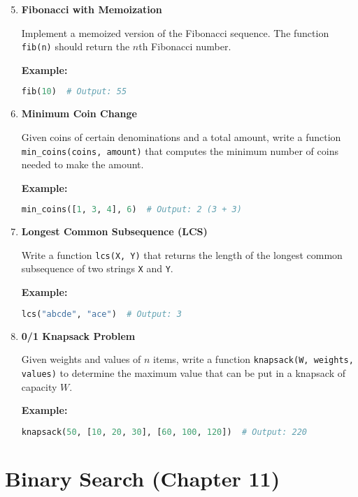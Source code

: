 \documentclass{article}
\begin{document}
\begin{enumerate}
    \setcounter{enumi}{4}
    \item \textbf{Fibonacci with Memoization}

    Implement a memoized version of the Fibonacci sequence. The function \texttt{fib(n)} should return the $n$th Fibonacci number.

    \textbf{Example:}
    \begin{lstlisting}[language=Python]
    fib(10)  # Output: 55
    \end{lstlisting}

    \item \textbf{Minimum Coin Change}

    Given coins of certain denominations and a total amount, write a function \texttt{min\_coins(coins, amount)} that computes the minimum number of coins needed to make the amount.

    \textbf{Example:}
    \begin{lstlisting}[language=Python]
    min_coins([1, 3, 4], 6)  # Output: 2 (3 + 3)
    \end{lstlisting}

    \item \textbf{Longest Common Subsequence (LCS)}

    Write a function \texttt{lcs(X, Y)} that returns the length of the longest common subsequence of two strings \texttt{X} and \texttt{Y}.

    \textbf{Example:}
    \begin{lstlisting}[language=Python]
    lcs("abcde", "ace")  # Output: 3
    \end{lstlisting}

    \item \textbf{0/1 Knapsack Problem}

    Given weights and values of $n$ items, write a function \texttt{knapsack(W, weights, values)} to determine the maximum value that can be put in a knapsack of capacity $W$.

    \textbf{Example:}
    \begin{lstlisting}[language=Python]
    knapsack(50, [10, 20, 30], [60, 100, 120])  # Output: 220
    \end{lstlisting}
\end{enumerate}

\section*{Binary Search (Chapter 11)}
\end{document}
